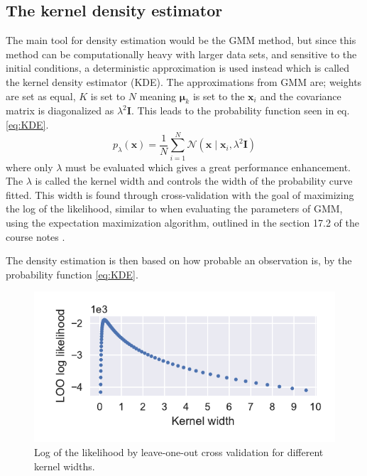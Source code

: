 \subsection{The kernel density estimator}
The main tool for density estimation would be the GMM method, but since this method can be computationally heavy with larger data sets, and sensitive to the initial conditions, a deterministic approximation is used instead which is called the kernel density estimator (KDE). The approximations from GMM are; weights are set as equal, $K$ is set to $N$ meaning $\mathbf{\mu}_k$ is set to the $\mathbf{x}_i$ and the covariance matrix is diagonalized as $\lambda^2 \mathbf{I}$. This leads to the probability function seen in eq. \eqref{eq:KDE}.
\begin{equation} \label{eq:KDE}
    p_{\lambda}(\mathbf{x}) = \frac{1}{N} \sum^N_{i=1} \mathcal{N}(\mathbf{x} \mid \mathbf{x}_i, \lambda^2 \mathbf{I} )
\end{equation}
where only $\lambda$ must be evaluated which gives a great performance enhancement. The $\lambda$ is called the kernel width and controls the width of the probability curve fitted. This width is found through cross-validation with the goal of maximizing the log of the likelihood, similar to when evaluating the parameters of GMM, using the expectation maximization algorithm, outlined in the section 17.2 of the course notes \cite{coursenotes}.

The density estimation is then based on how probable an observation is, by the probability function \eqref{eq:KDE}.

\begin{figure}
    \includegraphics[width=\linewidth]{fig/KDE_LOO.pdf}
    \caption{Log of the likelihood by leave-one-out cross validation for different kernel widths.}
    \label{fig:KDE_LOO}
\end{figure}

